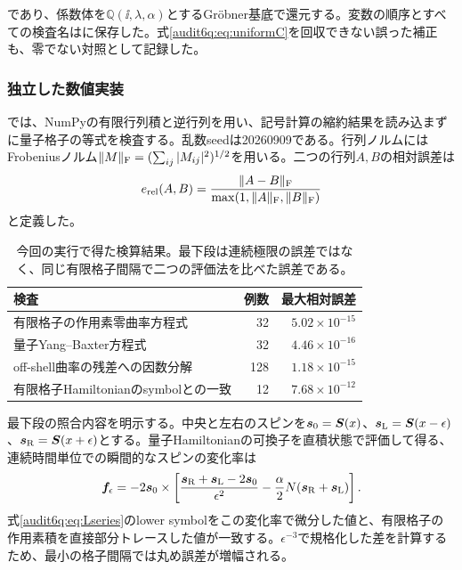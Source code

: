 であり、係数体を$\mathbb Q(\ii,\lambda,\alpha)$とするGröbner基底で還元する。変数の順序とすべての検査名はに保存した。式\eqref{audit6q:eq:uniformC}を回収できない誤った補正も、零でない対照として記録した。

\subsubsection{独立した数値実装}
では、NumPyの有限行列積と逆行列を用い、記号計算の縮約結果を読み込まずに量子格子の等式を検査する。乱数seedは20260909である。行列ノルムにはFrobeniusノルム$\|M\|_{\rm F}=(\sum_{ij}|M_{ij}|^2)^{1/2}$を用いる。二つの行列$A,B$の相対誤差は
\begin{equation}
e_{\rm rel}(A,B)=\frac{\|A-B\|_{\rm F}}{\max(1,\|A\|_{\rm F},\|B\|_{\rm F})}
\label{audit6q:eq:relerr}
\end{equation}
と定義した。

\begin{table}[htbp]
\centering\small
\begin{tabular}{L{82mm}rr}
\toprule
検査&例数&最大相対誤差\\\midrule
有限格子の作用素零曲率方程式&32&$5.02\times10^{-15}$\\
量子Yang--Baxter方程式&32&$4.46\times10^{-16}$\\
off-shell曲率の残差への因数分解&128&$1.18\times10^{-15}$\\
有限格子Hamiltonianのsymbolとの一致&12&$7.68\times10^{-12}$\\
\bottomrule
\end{tabular}
\caption{今回の実行で得た検算結果。最下段は連続極限の誤差ではなく、同じ有限格子間隔で二つの評価法を比べた誤差である。}
\label{audit6q:tab:checks}
\end{table}

最下段の照合内容を明示する。中央と左右のスピンを$\boldsymbol s_0=\boldsymbol S(x)$、$\boldsymbol s_{\rm L}=\boldsymbol S(x-\epsilon)$、$\boldsymbol s_{\rm R}=\boldsymbol S(x+\epsilon)$とする。量子Hamiltonianの可換子を直積状態で評価して得る、連続時間単位での瞬間的なスピンの変化率は
\begin{equation}
\boldsymbol f_\epsilon=-2\boldsymbol s_0\times\left[
\frac{\boldsymbol s_{\rm R}+\boldsymbol s_{\rm L}-2\boldsymbol s_0}{\epsilon^2}
-\frac\alpha2 N(\boldsymbol s_{\rm R}+\boldsymbol s_{\rm L})\right].
\label{audit6q:eq:finiteflow}
\end{equation}
式\eqref{audit6q:eq:Lseries}のlower symbolをこの変化率で微分した値と、有限格子の作用素積を直接部分トレースした値が一致する。$\epsilon^{-3}$で規格化した差を計算するため、最小の格子間隔では丸め誤差が増幅される。

